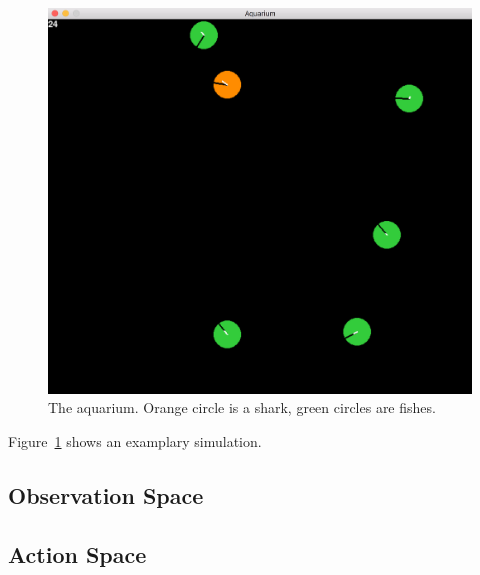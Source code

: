\documentclass[12pt, letterpaper, fleqn, notitlepage]{article}
\begin{document}
\begin{figure}
  \includegraphics[width=\linewidth]{demo.png}
  \caption{The aquarium. Orange circle is a shark, green circles are fishes.}\label{fig:demo}
\end{figure}

Figure~\ref{fig:demo} shows an examplary simulation.

\subsection{Observation Space}


\subsection{Action Space}
\end{document}
